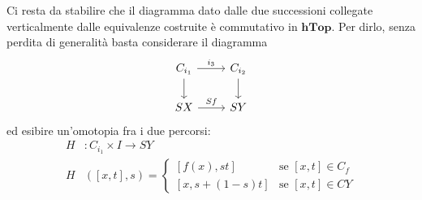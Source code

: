 \documentclass[a4paper]{article}
\theoremstyle{definition}
\theoremstyle{definition}
\theoremstyle{remark}
\theoremstyle{definition}
\begin{document}
Ci resta da stabilire che il diagramma dato dalle due successioni collegate verticalmente dalle equivalenze costruite è commutativo in $\mathbf{hTop}$. Per dirlo, senza perdita di generalità basta considerare il diagramma
\[
    \begin{tikzcd}
        C_{i_1} \arrow[r,"i_3"] \arrow[d] & C_{i_2} \arrow[d] \\
        SX \arrow[r,"Sf"] & SY
    \end{tikzcd}
\]
ed esibire un'omotopia fra i due percorsi:
\begin{align*}
    H & : C_{i_1} \times I \to SY                            \\
    H & ([x,t], s)  = \begin{cases}
                          [f (x), st]  & \text{se } [x,t]\in C_f \\
                          [x,s+(1-s)t] & \text{se } [x,t]\in CY
                      \end{cases}
\end{align*}
\end{document}
